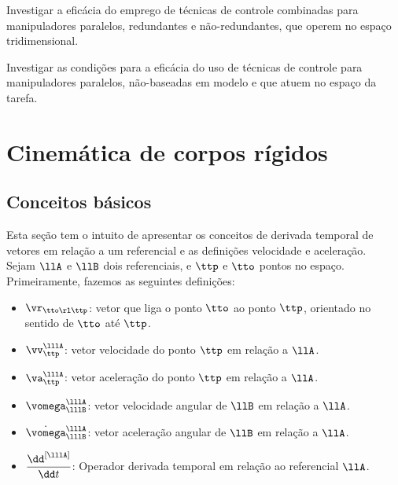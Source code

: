 \documentclass[]{politex}
\begin{document}
Investigar a eficácia do emprego de técnicas de controle combinadas para manipuladores paralelos, redundantes e não-redundantes, que operem no espaço tridimensional.

\vspace{0.3cm}

Investigar as condições para a eficácia do uso de técnicas de controle para manipuladores paralelos, não-baseadas em modelo e que atuem no espaço da tarefa.





%






\apendice

\chapter{Cinemática de corpos rígidos} \label{apendiceA}

\section{Conceitos básicos}

Esta seção tem o intuito de apresentar os conceitos de derivada temporal de vetores em relação a um referencial e as definições velocidade e aceleração. \\

Sejam $\llA$ e $\llB$ dois referenciais, e $\ttp$ e $\tto$ pontos no espaço. Primeiramente, fazemos as seguintes definições:

\begin{itemize}
\item $\vr_{\tto \rl \ttp}$: vetor que liga o ponto $\tto$ ao ponto $\ttp$, orientado no sentido de $\tto$ até $\ttp$.
\item $\vv_{\ttp}^{\lllA}$: vetor velocidade do ponto $\ttp$ em relação a $\llA$.
\item $\va_{\ttp}^{\lllA}$: vetor acelera\c{c}\~ao do ponto $\ttp$ em relação a $\llA$.
\item $\vomega_{\lllB}^{\lllA}$: vetor velocidade angular de $\llB$ em relação a $\llA$.
\item $\dot{\vomega}_{\lllB}^{\lllA}$: vetor aceleração angular de $\llB$ em relação a $\llA$.
\item $\displaystyle\frac{\dd^{[\lllA]}}{\dd t}$: Operador derivada temporal em relação ao referencial $\llA$.
\end{itemize}
\end{document}
